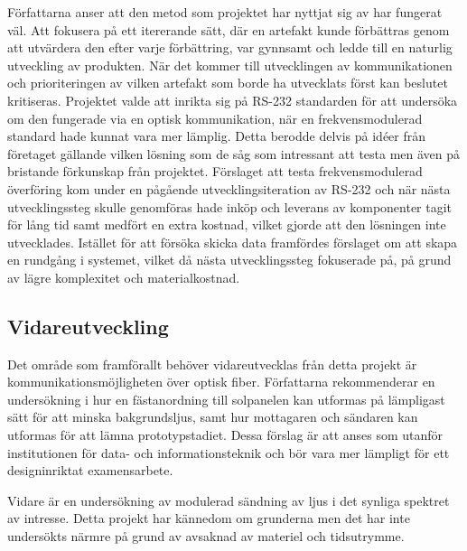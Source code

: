         Författarna anser att den metod som projektet har nyttjat sig av har fungerat väl. Att fokusera på ett itererande sätt, där en artefakt kunde förbättras genom att utvärdera den efter varje förbättring, var gynnsamt och ledde till en naturlig utveckling av produkten. När det kommer till utvecklingen av kommunikationen och prioriteringen av vilken artefakt som borde ha utvecklats först kan beslutet kritiseras. Projektet valde att inrikta sig på RS-232 standarden för att undersöka om den fungerade via en optisk kommunikation, när en frekvensmodulerad standard hade kunnat vara mer lämplig. Detta berodde delvis på idéer från företaget gällande vilken lösning som de såg som intressant att testa men även på bristande förkunskap från projektet. Förslaget att testa frekvensmodulerad överföring kom under en pågående utvecklingsiteration av RS-232 och när nästa utvecklingssteg skulle genomföras hade inköp och leverans av komponenter tagit för lång tid samt medfört en extra kostnad, vilket gjorde att den lösningen inte utvecklades. Istället för att försöka skicka data framfördes förslaget om att skapa en rundgång i systemet, vilket då nästa utvecklingssteg fokuserade på, på grund av lägre komplexitet och materialkostnad.

    \subsection{Vidareutveckling} %
    \label{sub:vidareutveckling}
        Det område som framförallt behöver vidareutvecklas från detta projekt är kommunikationsmöjligheten över optisk fiber. Författarna rekommenderar en undersökning i hur en fästanordning till solpanelen kan utformas på lämpligast sätt för att minska bakgrundsljus, samt hur mottagaren och sändaren kan utformas för att lämna prototypstadiet. Dessa förslag är att anses som utanför institutionen för data- och informationsteknik och bör vara mer lämpligt för ett designinriktat examensarbete. \bigskip

        Vidare är en undersökning av modulerad sändning av ljus i det synliga spektret av intresse. Detta projekt har kännedom om grunderna men det har inte undersökts närmre på grund av avsaknad av materiel och tidsutrymme.
    
